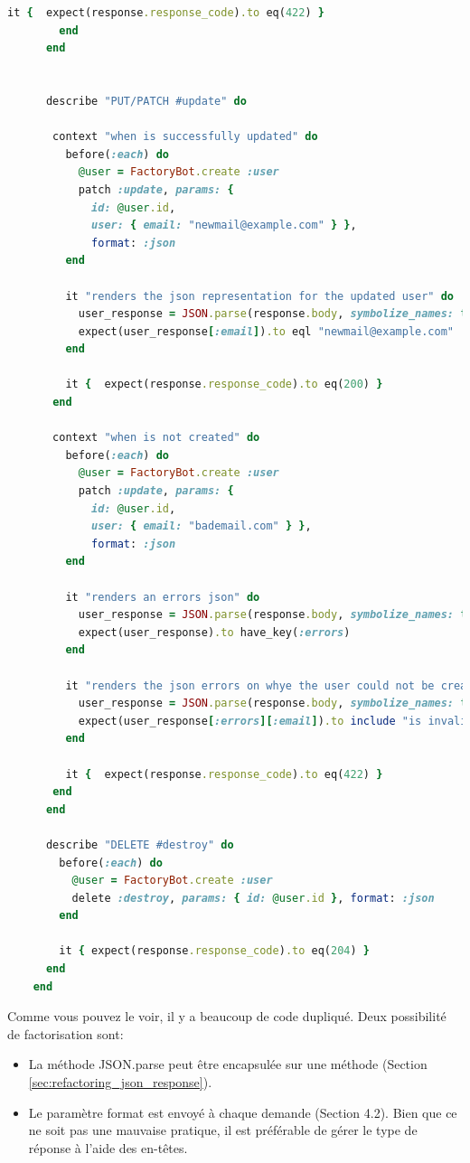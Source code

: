 \documentclass[]{report}
\begin{document}
\begin{scriptsize}
\begin{lstlisting}[language=ruby, caption={Le fichier de test du contrôlleur avant la refactorisation}, label={lst:users_controller_spec_before_factorization}]
          it {  expect(response.response_code).to eq(422) }
        end
      end


      describe "PUT/PATCH #update" do

       context "when is successfully updated" do
         before(:each) do
           @user = FactoryBot.create :user
           patch :update, params: {
             id: @user.id,
             user: { email: "newmail@example.com" } },
             format: :json
         end

         it "renders the json representation for the updated user" do
           user_response = JSON.parse(response.body, symbolize_names: true)
           expect(user_response[:email]).to eql "newmail@example.com"
         end

         it {  expect(response.response_code).to eq(200) }
       end

       context "when is not created" do
         before(:each) do
           @user = FactoryBot.create :user
           patch :update, params: {
             id: @user.id,
             user: { email: "bademail.com" } },
             format: :json
         end

         it "renders an errors json" do
           user_response = JSON.parse(response.body, symbolize_names: true)
           expect(user_response).to have_key(:errors)
         end

         it "renders the json errors on whye the user could not be created" do
           user_response = JSON.parse(response.body, symbolize_names: true)
           expect(user_response[:errors][:email]).to include "is invalid"
         end

         it {  expect(response.response_code).to eq(422) }
       end
      end

      describe "DELETE #destroy" do
        before(:each) do
          @user = FactoryBot.create :user
          delete :destroy, params: { id: @user.id }, format: :json
        end

        it { expect(response.response_code).to eq(204) }
      end
    end
    \end{lstlisting}
  \end{scriptsize}

  Comme vous pouvez le voir, il y a beaucoup de code dupliqué. Deux possibilité de factorisation sont:


  \begin{itemize}
    \item La méthode JSON.parse peut être encapsulée sur une méthode (Section \ref{sec:refactoring_json_response}).
    \item Le paramètre format est envoyé à chaque demande (Section 4.2). Bien que ce ne soit pas une mauvaise pratique, il est préférable de gérer le type de réponse à l'aide des en-têtes.
  \end{itemize}
\end{document}
